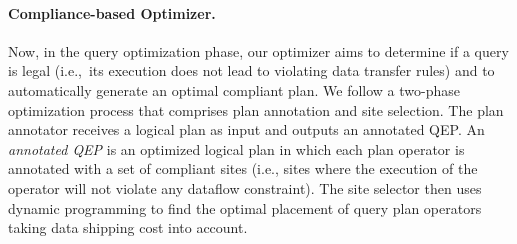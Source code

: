 \documentclass[11pt]{article}
\begin{document}
\paragraph{Compliance-based Optimizer.} %
\label{sec:compliance_based_optimization}
Now, in the query optimization phase, our optimizer aims to
determine if a query is legal (i.e.,~its execution does not
lead to violating data transfer rules) and to automatically
generate an optimal compliant plan. We follow a two-phase
optimization process that comprises plan annotation and site
selection. The plan annotator receives a logical plan as
input and outputs an annotated QEP. An \emph{annotated QEP}
is an optimized logical plan in which each plan operator is
annotated with a set of compliant sites (i.e., sites where
the execution of the operator will not violate any dataflow
constraint). The site selector then uses dynamic programming
to find the optimal placement of query plan operators taking
data shipping cost into account.
\end{document}

